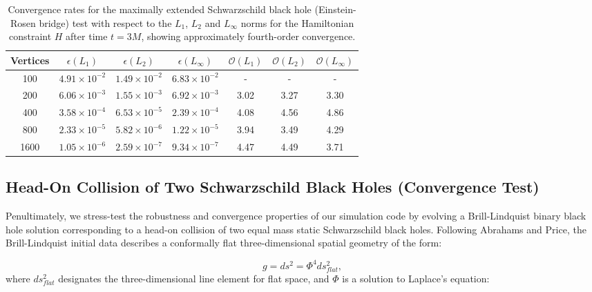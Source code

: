 \documentclass{article}
\begin{document}
\begin{table}[ht]
\center
\begin{tabular}{|c|c|c|c|c|c|c|}
\hline
Vertices & ${\epsilon \left( L_1 \right)}$ & ${\epsilon \left( L_2 \right)}$ & ${\epsilon \left( L_{\infty} \right)}$ & ${\mathcal{O} \left( L_1 \right)}$ & ${\mathcal{O} \left( L_2 \right)}$ & ${\mathcal{O} \left( L_{\infty} \right)}$\\
\hline\hline
100 & ${4.91 \times 10^{-2}}$ & ${1.49 \times 10^{-2}}$ & ${6.83 \times 10^{-2}}$ & - & - & -\\
\hline
200 & ${6.06 \times 10^{-3}}$ & ${1.55 \times 10^{-3}}$ & ${6.92 \times 10^{-3}}$ & 3.02 & 3.27 & 3.30\\
\hline
400 & ${3.58 \times 10^{-4}}$ & ${6.53 \times 10^{-5}}$ & ${2.39 \times 10^{-4}}$ & 4.08 & 4.56 & 4.86\\
\hline
800 & ${2.33 \times 10^{-5}}$ & ${5.82 \times 10^{-6}}$ & ${1.22 \times 10^{-5}}$ & 3.94 & 3.49 & 4.29\\
\hline
1600 & ${1.05 \times 10^{-6}}$ & ${2.59 \times 10^{-7}}$ & ${9.34 \times 10^{-7}}$ & 4.47 & 4.49 & 3.71\\
\hline
\end{tabular}
\caption{Convergence rates for the maximally extended Schwarzschild black hole (Einstein-Rosen bridge) test with respect to the ${L_1}$, ${L_2}$ and ${L_{\infty}}$ norms for the Hamiltonian constraint $H$ after time ${t = 3 M}$, showing approximately fourth-order convergence.}
\label{tab:Table3}
\end{table}

\clearpage

\subsection{Head-On Collision of Two Schwarzschild Black Holes (Convergence Test)}

Penultimately, we stress-test the robustness and convergence properties of our simulation code by evolving a Brill-Lindquist binary black hole solution corresponding to a head-on collision of two equal mass static Schwarzschild black holes. Following Abrahams and Price\cite{abrahams}\cite{abrahams2}\cite{anninos2}, the Brill-Lindquist initial data describes a conformally flat three-dimensional spatial geometry of the form:

\begin{equation}
g = ds^2 = \Phi^4 d s_{flat}^{2},
\end{equation}
where ${d s_{flat}^{2}}$ designates the three-dimensional line element for flat space, and ${\Phi}$ is a solution to Laplace's equation:
\end{document}
